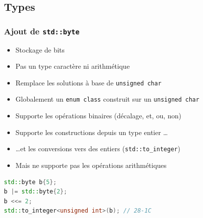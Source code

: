 \documentclass[C++.tex]{subfiles}
\begin{document}
\subsection*{Types}
\begin{frame}[fragile]
	\frametitle{Ajout de \lstinline|std::byte|}
	\begin{itemize}
		\item Stockage de bits
		\item Pas un type caractère ni \og arithmétique\fg{}
		\item Remplace les solutions à base de \lstinline|unsigned char|


		\item Globalement un \lstinline|enum class| construit sur un \lstinline|unsigned char|
		\item Supporte les opérations binaires (décalage, et, ou, non)
		\item Supporte les constructions depuis un type entier \ldots


		\item \ldots et les conversions vers des entiers (\lstinline|std::to_integer|)
		\item Mais ne supporte pas les opérations arithmétiques
	\end{itemize}

	\begin{lstlisting}[language=C++]
std::byte b{5};
b |= std::byte{2};
b <<= 2;
std::to_integer<unsigned int>(b); // 28-1C\end{lstlisting}
\end{frame}
\end{document}
